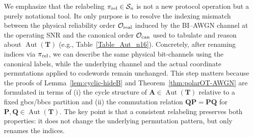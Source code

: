 \documentclass[onecolumn]{IEEEtran} %
\newcommand{\bA}{\mathbf A}
\newcommand{\bP}{\mathbf P}
\newcommand{\bQ}{\mathbf Q}
\newcommand{\1}{\mathbbm{1}}
\DeclareMathOperator{\Aut}{Aut}
\theoremstyle{boldremark}
\newcommand{\bT}{\mathbf{T}}
\begin{document}
We emphasize that the relabeling $\pi_{\rm rel}\in\mathcal{S}_n$ is not a new
protocol operation but a purely notational tool. Its only purpose is to
resolve the indexing mismatch between the physical reliability order
$\mathcal{O}_{\rm real}$ induced by the BI--AWGN channel at the operating SNR
and the canonical order $\mathcal{O}_{\rm can}$ used to tabulate and reason about
$\Aut(\bT)$ (e.g., Table~\ref{Table_Aut_n16}). Concretely, after renaming indices
via $\pi_{\rm rel}$, we can describe the same physical bit-channels using the
canonical labels, while the underlying channel and the actual coordinate
permutations applied to codewords remain unchanged. This step matters because the proofs of Lemma~\ref{lem:cyclic-hideB} and Theorem~\ref{thm:polarOT-AWGN} are formulated in terms
of (i) the cycle structure of $\bA\in\Aut(\bT)$ relative to a fixed
\gls{gbcs}/\gls{bbcs} partition and (ii) the commutation relation $\bQ\bP=\bP\bQ$
for $\bP,\bQ\in\Aut(\bT)$. The key point is that a consistent relabeling preserves
both properties: it does not change the underlying permutation pattern, but only
renames the indices.
\end{document}
